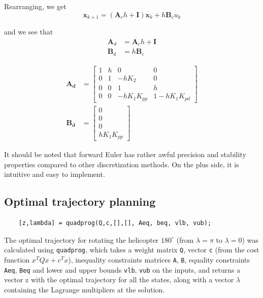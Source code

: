 Rearranging, we get
\begin{equation}
    \mathbf{x}_{k+1} = (\mathbf{A}_ch + \mathbf{I})\mathbf{x}_k + h\mathbf{B}_c{u}_k
\end{equation}

and we see that
\begin{subequations}
    \begin{align}
        \mathbf{A}_d &= \mathbf{A}_ch+\mathbf{I} \\
        \mathbf{B}_d &= h\mathbf{B}_c
    \end{align}
    \label{eq:eulerfwd}
\end{subequations}

\begin{subequations}
    \begin{align}
        \mathbf{A_d} &= \begin{bmatrix}
        1 & h & 0 & 0\\
        0 & 1 & -hK_2 & 0\\
        0 & 0 & 1 & h\\
        0 & 0 & -hK_1K_{pp} & 1-hK_1K_{pd}
        \end{bmatrix}\\
        \mathbf{B_d} &= \begin{bmatrix}
        0\\
        0\\
        0\\
        hK_1K_{pp}
    \end{bmatrix}
    \end{align}
\end{subequations}

It should be noted that forward Euler has rather awful precision and stability properties compared to other discretization methods. On the plus side, it is intuitive and easy to implement.

\subsection{Optimal trajectory planning}
\begin{lstlisting}
    [z,lambda] = quadprog(Q,c,[],[], Aeq, beq, vlb, vub);
\end{lstlisting}

The optimal trajectory for rotating the helicopter $180^\circ$ (from $\lambda=\pi$ to $\lambda=0$) was calculated using \texttt{quadprog}, which takes a weight matrix \texttt{Q}, vector \texttt{c} (from the cost function $x^TQx + c^Tx$), inequality constraints matrices \texttt{A}, \texttt{B}, equality constraints \texttt{Aeq}, \texttt{Beq} and lower and upper bounds \texttt{vlb}, \texttt{vub} on the inputs, and returns a vector z with the optimal trajectory for all the states, along with a vector $\lambda$ containing the Lagrange multipliers at the solution.

